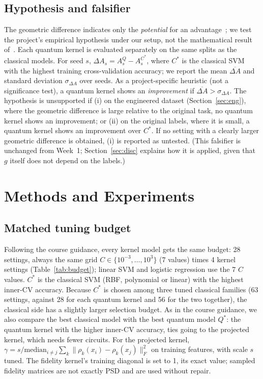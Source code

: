 \documentclass[conference]{IEEEtran}
\begin{document}
\subsection{Hypothesis and falsifier}
The geometric difference indicates only the \emph{potential} for an advantage~\cite{huang2021}; we test the project's empirical hypothesis under our setup, not the mathematical result of~\cite{huang2021}. Each quantum kernel is evaluated separately on the same splits as the classical models. For seed $s$, $\Delta A_s = A^{Q}_s - A^{C^\ast}_s$, where $C^\ast$ is the classical SVM with the highest training cross-validation accuracy; we report the mean $\overline{\Delta A}$ and standard deviation $\sigma_{\Delta A}$ over seeds. As a project-specific heuristic (not a significance test), a quantum kernel shows an \emph{improvement} if $\overline{\Delta A} > \sigma_{\Delta A}$. The hypothesis is unsupported if (i) on the engineered dataset (Section~\ref{sec:eng}), where the geometric difference is large relative to the original task, no quantum kernel shows an improvement; or (ii) on the original labels, where it is small, a quantum kernel shows an improvement over $C^\ast$. If no setting with a clearly larger geometric difference is obtained, (i) is reported as untested. (This falsifier is unchanged from Week~1; Section~\ref{sec:disc} explains how it is applied, given that $g$ itself does not depend on the labels.)

\section{Methods and Experiments}
\subsection{Matched tuning budget}\label{sec:budget}
Following the course guidance, every kernel model gets the same budget: 28 settings, always the same grid $C\in\{10^{-3},\dots,10^{3}\}$ (7 values) times 4 kernel settings (Table~\ref{tab:budget}); linear SVM and logistic regression use the 7 $C$ values. $C^\ast$ is the classical SVM (RBF, polynomial or linear) with the highest inner-CV accuracy. Because $C^\ast$ is chosen among three tuned classical families (63 settings, against 28 for each quantum kernel and 56 for the two together), the classical side has a slightly larger selection budget. As in the course guidance, we also compare the best classical model with the best quantum model $Q^\ast$: the quantum kernel with the higher inner-CV accuracy, ties going to the projected kernel, which needs fewer circuits. For the projected kernel, $\gamma = s/\mathrm{median}_{i\neq j}\sum_k\|\rho_k(x_i)-\rho_k(x_j)\|_F^2$ on training features, with scale $s$ tuned. The fidelity kernel's training diagonal is set to 1, its exact value; sampled fidelity matrices are not exactly PSD and are used without repair.
\end{document}
